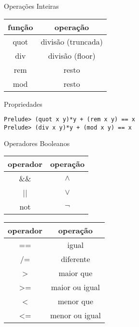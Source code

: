 \documentclass{beamer}
\begin{document}
	\begin{frame}[fragile]{Operações Inteiras}
	
	\begin{table}[h]
		\begin{tabular}{c | c}
			\hline
			função & operação\\
			\hline
			quot & divisão (truncada) \\
			div & divisão (floor) \\
			rem & resto \\
			mod & resto \\
			\hline
		\end{tabular}
	\end{table}
	
	\begin{block}{Propriedades}
		\begin{lstlisting}
Prelude> (quot x y)*y + (rem x y) == x  
Prelude> (div x y)*y + (mod x y) == x
		\end{lstlisting}
	 \end{block}

	\end{frame}
	
	\begin{frame}{Operadores Booleanos}
	 
	 \begin{table}[h]
	  \begin{tabular}{c | c}
	  \hline
	   operador & operação\\
	   \hline
	   \&\& & $\land$ \\
	   || & $\lor$ \\
	   not & $\lnot$ \\
	   \hline
	  \end{tabular}
	 \end{table}
	 
	 \begin{table}[h]
	  \begin{tabular}{c | c}
	  \hline
	   operador & operação\\
	   \hline
	   == & igual \\
	   /= & diferente \\
	   > & maior que \\
	   >= & maior ou igual \\
	   < & menor que \\
	   <= & menor ou igual \\
	  \end{tabular}
	 \end{table} 
	\end{frame}
	
\end{document}
